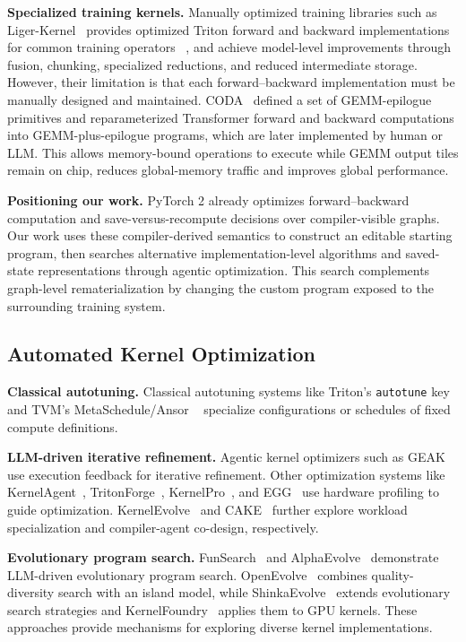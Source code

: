 \noindent\textbf{Specialized training kernels.}
Manually optimized training libraries such as Liger-Kernel~\cite{hsu2024liger} provides optimized Triton forward and backward implementations for common training operators
~\cite{hsu2024liger}, and achieve model-level improvements through fusion,
chunking, specialized reductions, and reduced intermediate storage. However, their
limitation is that each forward--backward implementation must be manually
designed and maintained. CODA~\cite{guo2026coda} defined a set of GEMM-epilogue primitives and reparameterized Transformer forward and backward computations into GEMM-plus-epilogue programs, which are later implemented by human or LLM. This allows memory-bound operations to execute while GEMM output tiles remain on chip, reduces global-memory traffic and improves global performance.

\noindent\textbf{Positioning our work.}
PyTorch 2 already optimizes forward--backward computation and save-versus-recompute decisions over compiler-visible graphs. Our work uses these compiler-derived semantics to construct an editable starting program, then searches alternative implementation-level algorithms and saved-state representations through agentic optimization. This search complements graph-level rematerialization by changing the custom program exposed to the surrounding training system.

\subsection{Automated Kernel Optimization}

\noindent\textbf{Classical autotuning.}
Classical autotuning systems like Triton's \texttt{autotune} key~\cite{tillet2019triton} and TVM's
MetaSchedule/Ansor ~\cite{zheng2020ansor} specialize configurations or schedules of
fixed compute definitions.

\noindent\textbf{LLM-driven iterative refinement.}
Agentic kernel optimizers such as GEAK~\cite{wang2025geak} use execution feedback for iterative refinement. Other optimization systems like  KernelAgent~\cite{cheng2026kernelagent}, TritonForge~\cite{li2025tritonforge}, KernelPro~\cite{gai2026kernelpro}, and EGG~\cite{han2026egg} use hardware profiling to guide optimization. KernelEvolve~\cite{liao2026kernelevolve} and CAKE~\cite{ye2026cake} further explore workload specialization and compiler-agent co-design, respectively.


\noindent\textbf{Evolutionary program search.} FunSearch~\cite{romera2024funsearch} and AlphaEvolve~\cite{novikov2025alphaevolve} demonstrate LLM-driven evolutionary program search. OpenEvolve~\cite{sharma2025openevolve} combines quality-diversity search with an island model, while ShinkaEvolve~\cite{shinkaevolve} extends evolutionary search strategies and KernelFoundry~\cite{kernelfoundry} applies them to GPU kernels. These approaches provide mechanisms for exploring diverse kernel implementations.


